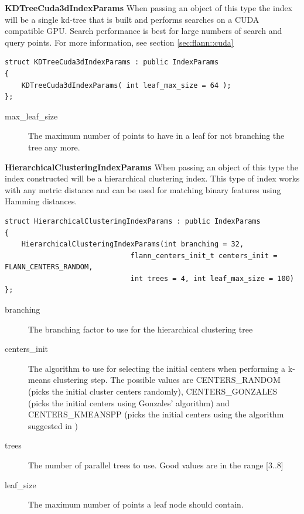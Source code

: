 \documentclass[letter,10pt]{article}
\begin{document}
\begin{description}
\textbf{KDTreeCuda3dIndexParams} When passing an object of this type the index will be a single kd-tree that 
is built and performs searches on a CUDA compatible GPU. Search performance is best for large numbers of search and query points.
For more information, see section \ref{sec:flann::cuda}
\begin{Verbatim}[fontsize=\footnotesize]
struct KDTreeCuda3dIndexParams : public IndexParams
{
    KDTreeCuda3dIndexParams( int leaf_max_size = 64 );
};
\end{Verbatim}
\begin{description}
 \item[max\_leaf\_size] The maximum number of points to have in a leaf for not branching the tree any more.
\end{description}


\textbf{HierarchicalClusteringIndexParams} When passing an object of this type the index constructed will be a
hierarchical clustering index. This type of index works with any metric distance and can be used for matching 
binary features using Hamming distances.
\begin{Verbatim}[fontsize=\footnotesize]
struct HierarchicalClusteringIndexParams : public IndexParams
{
    HierarchicalClusteringIndexParams(int branching = 32,
                              flann_centers_init_t centers_init = FLANN_CENTERS_RANDOM,
                              int trees = 4, int leaf_max_size = 100)
};
\end{Verbatim}
\begin{description}
\item[branching]{ The branching factor to use for the hierarchical clustering tree }
\item[centers\_init]{ The algorithm to use for selecting the initial
                  centers when performing a k-means clustering step. The possible values are
                  CENTERS\_RANDOM (picks the initial cluster centers randomly), CENTERS\_GONZALES (picks the
                  initial centers using Gonzales' algorithm) and CENTERS\_KMEANSPP (picks the initial
                centers using the algorithm suggested in \cite{arthur_kmeanspp_2007}) }
\item[trees] The number of parallel trees to use. Good values are in the range [3..8]
\item[leaf\_size] The maximum number of points a leaf node should contain.
\end{description}



\end{description}
\end{document}
